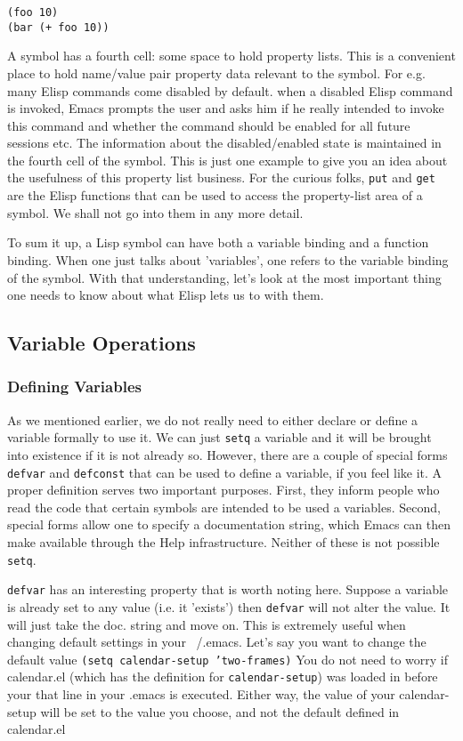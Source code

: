 \documentclass[10pt]{article}
\begin{document}
\begin{verbatim}
(foo 10)
(bar (+ foo 10))
\end{verbatim}

A symbol has a fourth cell: some space to hold property lists.  This is a
convenient place to hold name/value pair property data relevant to the symbol.
For e.g. many Elisp commands come disabled by default.  when a disabled Elisp
command is invoked, Emacs prompts the user and asks him if he really intended
to invoke this command and whether the command should be enabled for all future
sessions etc.  The information about the disabled/enabled state is maintained
in the fourth cell of the symbol.  This is just one example to give you an idea
about the usefulness of this property list business.  For the curious folks,
\texttt{put} and \texttt{get} are the Elisp functions that can be used to
access the property-list area of a symbol.  We shall not go into them in any
more detail.

To sum it up, a Lisp symbol can have both a variable binding and a function
binding.  When one just talks about 'variables', one refers to the variable
binding of the symbol.  With that understanding, let's look at the most
important thing one needs to know about what Elisp lets us to with them.

\subsection{Variable Operations}

\subsubsection{Defining Variables}

As we mentioned earlier, we do not really need to either declare or define a
variable formally to use it.  We can just \texttt{setq} a variable and it will
be brought into existence if it is not already so.  However, there are a couple
of special forms \texttt{defvar} and \texttt{defconst} that can be used to
define a variable, if you feel like it.  A proper definition serves two
important purposes.  First, they inform people who read the code that certain
symbols are intended to be used a variables.  Second, special forms allow one
to specify a documentation string, which Emacs can then make available through
the Help infrastructure.  Neither of these is not possible \texttt{setq}.

\texttt{defvar} has an interesting property that is worth noting here.  Suppose
a variable is already set to any value (i.e. it 'exists') then \texttt{defvar}
will not alter the value.  It will just take the doc. string and move on.  This
is extremely useful when changing default settings in your ~/.emacs.  Let's say
you want to change the default value \texttt{(setq calendar-setup 'two-frames)}
You do not need to worry if calendar.el (which has the definition for
\texttt{calendar-setup}) was loaded in before your that line in your .emacs is
executed.  Either way, the value of your calendar-setup will be set to the
value you choose, and not the default defined in calendar.el
\end{document}
